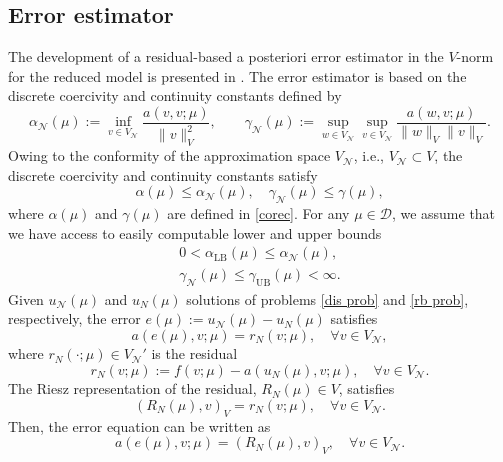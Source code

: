 \documentclass[12pt]{article}
\theoremstyle{remark}
\theoremstyle{definition}
\numberwithin{equation}{section}
\begin{document}
\subsection{Error estimator}
The development of a residual-based a posteriori error estimator in the $V$-norm for the reduced model is presented in \cite{rozza2008reduced}. The error estimator is based on the discrete coercivity and continuity constants defined by
\begin{equation}
    \alpha_{\mathcal{N}}(\mu):=\inf _{v \in V_{\mathcal{N}}} \frac{a(v, v ; \mu)}{\|v\|_{V}^2}, \quad  \quad \gamma_{\mathcal{N}}(\mu):=\sup _{w \in V_{\mathcal{N}}} \sup _{v \in V_{\mathcal{N}}} \frac{a(w, v ; \mu)}{\|w\|_V \|v\|_{V}}.
\end{equation}
Owing to the conformity of the approximation space $V_{\mathcal{N}}$, i.e., $V_{\mathcal{N}}\subset V$, the discrete coercivity and continuity constants satisfy
\begin{equation}
    \alpha(\mu) \leq \alpha_{\mathcal{N}}(\mu), \quad \gamma_{\mathcal{N}}(\mu)\leq \gamma(\mu), 
\end{equation}
where $\alpha(\mu)$ and $\gamma(\mu)$ are defined in \eqref{corec}. For any $\mu \in \mathcal{D}$, we assume that we have access to easily computable lower and upper bounds
\begin{align}
    0<\alpha_{\mathrm{LB}}(\mu)  \leq \alpha_{\mathcal{N}}(\mu), \\
     \gamma_{\mathcal{N}}(\mu) \leq  \gamma_{\mathrm{UB}}(\mu)  < \infty.
\end{align}
Given $u_{\mathcal{N}}(\mu)$ and $u_N(\mu)$ solutions of problems \eqref{dis prob} and \eqref{rb prob}, respectively, the error $e(\mu):= u_{\mathcal{N}}(\mu)-u_N(\mu)$ satisfies
\begin{equation}
    a(e(\mu),v;\mu)=r_N(v;\mu), \quad \forall v \in V_{\mathcal{N}},
\end{equation}
where $r_N(\cdot;\mu) \in V_{\mathcal{N}}'$ is the residual 
\begin{equation}
    r_N\left(v ; \mu\right):=f\left(v ; \mu\right)-a\left(u_N(\mu), v ; \mu\right), \quad \forall v \in V_{\mathcal{N}}.
\end{equation}
The Riesz representation of the residual, $R_N(\mu) \in V$, satisfies 
\begin{equation}
    \left(R_N(\mu),v\right)_V=r_N(v;\mu), \quad \forall v \in V_{\mathcal{N}}.
\end{equation}
Then, the error equation can be written as
\begin{equation}
    a(e(\mu),v;\mu)=\left(R_N(\mu),v\right)_V, \quad \forall v \in V_{\mathcal{N}}.
    \label{error}
\end{equation}
\end{document}
